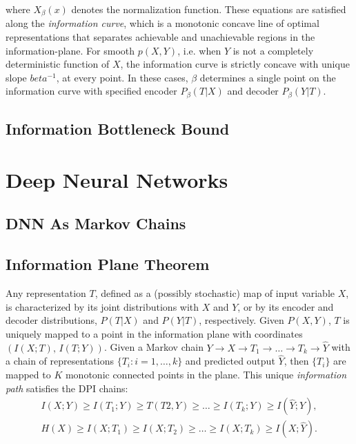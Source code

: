\documentclass[11pt]{article}
\begin{document}
where $X_\beta(x)$ denotes the normalization function. These equations are satisfied along the \textit{information curve}, which is a monotonic concave line of optimal representations that separates achievable and unachievable regions in the information-plane. For smooth $p(X,Y)$, i.e. when $Y$ is not a completely deterministic function of $X$, the information curve is strictly concave with unique slope $beta^{-1}$, at every point. In these cases, $\beta$ determines a single point on the information curve with specified encoder $P_\beta(T\vert X)$ and decoder $P_\beta(Y\vert T)$.

\subsection*{Information Bottleneck Bound}





\section{Deep Neural Networks}

\subsection*{DNN As Markov Chains}



\subsection*{Information Plane Theorem}

Any representation $T$, defined as a (possibly stochastic) map of input variable $X$, is characterized by its joint distributions with $X$ and $Y$, or by its encoder and decoder distributions, $P(T\vert X)$ and $P(Y\vert T)$, respectively. Given $P(X,Y)$, $T$ is uniquely mapped to a point in the information plane with coordinates $(I(X;T),\,I(T;Y))$. Given a Markov chain $Y\rightarrow X \rightarrow T_1 \rightarrow \ldots \rightarrow T_k \rightarrow \hat{Y}$ with a chain of representations $\{T_i : i=1,\ldots,k\}$ and predicted output $\hat{Y}$, then $\{T_i\}$ are mapped to $K$ monotonic connected points in the plane. This unique \textit{information path} satisfies the DPI chains:
\begin{gather}
I(X;Y) \geq I(T_1;Y) \geq T(T2,Y) \geq \ldots \geq I(T_k; Y) \geq I(\hat{Y}; Y),\\
H(X) \geq I(X;T_1) \geq I(X;T_2) \geq \ldots \geq I(X;T_k) \geq I(X;\hat{Y}).
\end{gather}
\end{document}

